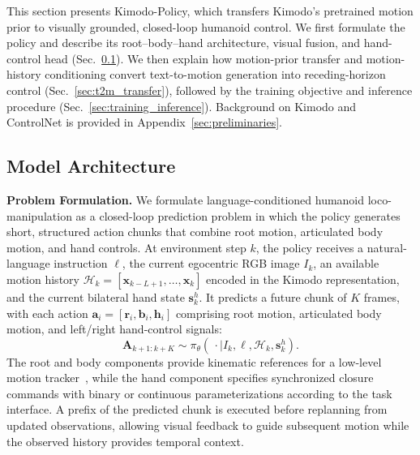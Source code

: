 This section presents Kimodo-Policy, which transfers Kimodo's pretrained motion prior to visually grounded, closed-loop humanoid control. We first formulate the policy and describe its root--body--hand architecture, visual fusion, and hand-control head (Sec.~\ref{sec:method_architecture}). We then explain how motion-prior transfer and motion-history conditioning convert text-to-motion generation into receding-horizon control (Sec.~\ref{sec:t2m_transfer}), followed by the training objective and inference procedure (Sec.~\ref{sec:training_inference}). Background on Kimodo and ControlNet is provided in Appendix~\ref{sec:preliminaries}.

\subsection{Model Architecture}
\label{sec:method_architecture}

\textbf{Problem Formulation.} We formulate language-conditioned humanoid loco-manipulation as a closed-loop prediction problem in which the policy generates short, structured action chunks that combine root motion, articulated body motion, and hand controls. At environment step $k$, the policy receives a natural-language instruction $\ell$, the current egocentric RGB image $I_k$, an available motion history $\mathcal{H}_k=[\mathbf{x}_{k-L+1},\ldots,\mathbf{x}_k]$ encoded in the Kimodo representation, and the current bilateral hand state $\mathbf{s}^{h}_k$. It predicts a future chunk of $K$ frames, with each action $\mathbf{a}_i=[\mathbf{r}_i,\mathbf{b}_i,\mathbf{h}_i]$ comprising root motion, articulated body motion, and left/right hand-control signals:
\begin{equation}
  \mathbf{A}_{k+1:k+K}\sim\pi_{\theta}(\,\cdot\mid I_k,\ell,\mathcal{H}_k,\mathbf{s}^{h}_k).
  \label{eq:policy_formulation}
\end{equation}
The root and body components provide kinematic references for a low-level motion tracker~\cite{ze2025twist2scalableportableholistic,guan2026limmtmotiontracking}, while the hand component specifies synchronized closure commands with binary or continuous parameterizations according to the task interface. A prefix of the predicted chunk is executed before replanning from updated observations, allowing visual feedback to guide subsequent motion while the observed history provides temporal context.

